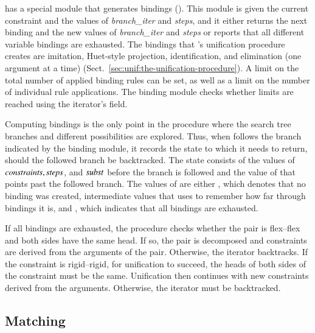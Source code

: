\ehohii{} has a special module that generates bindings (). This
module is given the current constraint and the values of \emph{branch\_iter} and
\emph{steps}, and it either returns the next binding and the new values of
\emph{branch\_iter} and \emph{steps} or reports that all different variable
bindings are exhausted. The bindings that \ehohii{}'s unification procedure creates
are imitation, Huet-style projection, identification, and elimination (one
argument at a time) (Sect.~\ref{sec:unif:the-unification-procedure}). A limit on the
total number of applied binding rules can be set, as well as a limit on the
number of individual rule applications. The binding module checks whether limits
are reached using the iterator's  field.

Computing bindings is the only point in the procedure where the search tree
branches and different possibilities are explored. Thus, when \ehohii{} follows
the branch indicated by the binding module, it records the state to which it
needs to return, should the followed branch be backtracked. The state consists of
the values
of $\mathit{constraints}, \mathit{steps}$, and $\mathit{subst}$ before the branch is followed
and the value of  that points past the followed branch. The
values of  are either , which denotes that no
binding was created, intermediate values that  uses to remember
how far through bindings it is, and , which indicates that all
bindings are exhausted.

If all bindings are exhausted, the procedure checks whether the pair is
flex--flex and both sides have the same head. If so, the pair is decomposed and
constraints are derived from the arguments of the pair. Otherwise, the iterator
backtracks.
%
If the constraint is rigid--rigid, for unification to succeed, the heads of both
sides of the constraint must be the same. Unification then continues
with new constraints derived from the arguments. Otherwise, the iterator must be
backtracked.

\subsection{Matching} 

